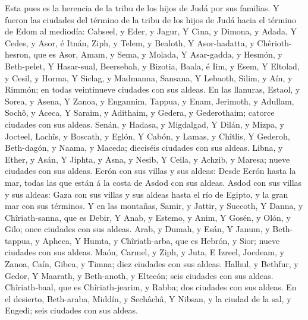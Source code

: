  Esta pues es la herencia de la tribu de los hijos de
Judá por sus familias.  Y fueron las ciudades del término
de la tribu de los hijos de Judá hacia el término de Edom al mediodía:
Cabseel, y Eder, y Jagur,  Y Cina, y Dimona, y Adada,
 Y Cedes, y Asor, é Itnán,  Ziph, y Telem,
y Bealoth,  Y Asor-hadatta, y Chêrioth-hesron, que es
Asor,  Amam, y Sema, y Molada,  Y
Asar-gadda, y Hesmón, y Beth-pelet,  Y Hasar-sual,
Beersebah, y Bizotia,  Baala, é Iim, y Esem,
 Y Eltolad, y Cesil, y Horma,  Y Siclag, y
Madmanna, Sansana,  Y Lebaoth, Silim, y Aín, y Rimmón; en
todas veintinueve ciudades con sus aldeas.  En las
llanuras, Estaol, y Sorea, y Asena,  Y Zanoa, y Engannim,
Tappua, y Enam,  Jerimoth, y Adullam, Sochô, y Aceca,
 Y Saraim, y Adithaim, y Gedera, y Gederothaim; catorce
ciudades con sus aldeas.  Senán, y Hadasa, y Migdalgad,
 Y Dilán, y Mizpa, y Jocteel,  Lachîs, y
Boscath, y Eglón,  Y Cabón, y Lamas, y Chîtlis,
 Y Gederoh, Beth-dagón, y Naama, y Maceda; dieciséis
ciudades con sus aldeas.  Libna, y Ether, y Asán,
 Y Jiphta, y Asna, y Nesib,  Y Ceila, y
Achzib, y Maresa; nueve ciudades con sus aldeas.  Ecrón
con sus villas y sus aldeas:  Desde Ecrón hasta la mar,
todas las que están á la costa de Asdod con sus aldeas. 
Asdod con sus villas y sus aldeas: Gaza con sus villas y sus aldeas
hasta el río de Egipto, y la gran mar con sus términos. 
Y en las montañas, Samir, y Jattir, y Succoth,  Y Danna,
y Chîriath-sanna, que es Debir,  Y Anab, y Estemo, y
Anim,  Y Gosén, y Olón, y Gilo; once ciudades con sus
aldeas.  Arab, y Dumah, y Esán,  Y Janum,
y Beth-tappua, y Apheca,  Y Humta, y Chîriath-arba, que
es Hebrón, y Sior; nueve ciudades con sus aldeas.  Maón,
Carmel, y Ziph, y Juta,  E Izreel, Jocdeam, y Zanoa,
 Caín, Gibea, y Timna; diez ciudades con sus aldeas.
 Halhul, y Bethfur, y Gedor,  Y Maarath, y
Beth-anoth, y Eltecón; seis ciudades con sus aldeas. 
Chîriath-baal, que es Chîriath-jearim, y Rabba; dos ciudades con sus
aldeas.  En el desierto, Beth-araba, Middín, y Sechâchâ,
 Y Nibsan, y la ciudad de la sal, y Engedi; seis ciudades
con sus aldeas.

